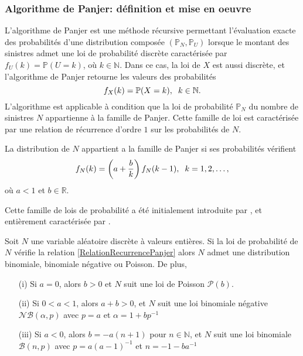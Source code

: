 \subsubsection{Algorithme de Panjer: définition et mise en oeuvre}
L\rq{}algorithme de Panjer est une méthode récursive permettant l\rq{}évaluation exacte des probabilités d\rq{}une distribution composée $(\mathbb{P}_{N},\mathbb{P}_{U})$ lorsque le montant des sinistres admet une loi de probabilité discrète caractérisée par $f_{U}(k)=\mathbb{P}(U=k)$, où $k\in\mathbb{N}$. Dans ce cas,  la loi de $X$ est aussi discrète, et l\rq{}algorithme de Panjer retourne les valeurs des probabilités   
\begin{equation}\label{DensityDicreteCompoundDistribution}
f_{X}(k)=\mathbb{P}(X=k),\hspace{0.2cm}k\in\mathbb{N}.
\end{equation} 
L\rq{}algorithme est applicable à condition que la loi de probabilité $\mathbb{P}_{N}$ du nombre de sinistres $N$ appartienne à la famille de Panjer. Cette famille de loi est caractérisée par une relation de récurrence d\rq{}ordre $1$ sur les probabilités de $N$.
\begin{Def}[Panjer 1981]
La distribution de $N$ appartient a la famille de Panjer si ses probabilités vérifient
\begin{equation}\label{RelationRecurrencePanjer}
f_{N}(k)=\left(a+\frac{b}{k}\right)f_{N}(k-1),\hspace{0.2cm}k=1,2,\ldots,
\end{equation}
où $a<1$ et $b\in\mathbb{R}$.
\end{Def}
Cette famille de lois de probabilité a été initialement introduite par \citet{Ka65}, et entièrement caractérisée par \citet{SuJe81}.
\begin{Theo}
Soit $N$ une variable aléatoire discrète à valeurs entières. Si la loi de probabilité de $N$ vérifie la relation \eqref{RelationRecurrencePanjer} alors $N$ admet une distribution binomiale, binomiale négative ou Poisson. De plus,
\begin{itemize}
\item[(i)] Si $a=0$, alors $b>0$ et $N$ suit une loi de Poisson $\mathcal{P}(b)$.
\item[(ii)] Si $0<a<1$, alors $a+b>0$, et $N$ suit une loi binomiale négative $\mathcal{N}\mathcal{B}(\alpha,p)$ avec $p=a$ et $\alpha=1+bp^{-1}$
\item[(iii)] Si $a<0$, alors $b=-a(n+1)$ pour $n\in\mathbb{N}$, et $N$ suit une loi binomiale $\mathcal{B}(n,p)$ avec $p=a(a-1)^{-1}$ et $n=-1-ba^{-1}$
\end{itemize} 
\end{Theo}
